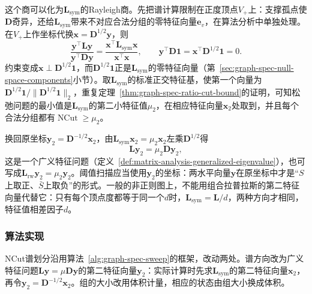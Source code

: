 这个商可以化为$\bm L_{\mathrm{sym}}$的Rayleigh商。先把谱计算限制在正度顶点$V_+$上：支撑孤点使$\bm D$奇异，还给$\bm L_{\mathrm{sym}}$带来不对应合法分组的零特征向量$\bm e_v$，在算法分析中单独处理。在$V_+$上作坐标代换$\bm x=\bm D^{1/2}\bm y$，则
\[
 \frac{\bm y^{\top}\bm L\bm y}{\bm y^{\top}\bm D\bm y}=\frac{\bm x^{\top}\bm L_{\mathrm{sym}}\bm x}{\bm x^{\top}\bm x},\qquad
 \bm y^{\top}\bm D\bm1=\bm x^{\top}\bm D^{1/2}\bm1=0 .
\]
约束变成$\bm x\perp\bm D^{1/2}\bm1$，而$\bm D^{1/2}\bm1$正是$\bm L_{\mathrm{sym}}$的零特征向量（第~\ref{sec:graph-spec-null-space-components}小节）。取$\bm L_{\mathrm{sym}}$的标准正交特征基，使第一个向量为$\bm D^{1/2}\bm1/\lVert\bm D^{1/2}\bm1\rVert_2$，重复定理~\ref{thm:graph-spec-ratio-cut-bound}的证明，可知松弛问题的最小值是$\bm L_{\mathrm{sym}}$的第二小特征值$\mu_2$，在相应特征向量$\bm x_2$处取到，并且每个合法分组都有$\operatorname{NCut}\geq\mu_2$。

换回原坐标$\bm y_2=\bm D^{-1/2}\bm x_2$，由$\bm L_{\mathrm{sym}}\bm x_2=\mu_2\bm x_2$左乘$\bm D^{1/2}$得
\[
 \bm L\bm y_2=\mu_2\bm D\bm y_2 ,
\]
这是一个广义特征问题（定义~\ref{def:matrix-analysis-generalized-eigenvalue}），也可写成$\bm L_{\mathrm{rw}}\bm y_2=\mu_2\bm y_2$。阈值扫描应当使用$\bm y_2$的坐标：两水平向量$\bm y$在原坐标中才是“$S$上取正、$\bar S$上取负”的形式。一般的非正则图上，不能用组合拉普拉斯的第二特征向量代替它：只有每个顶点度都等于同一个$d$时，$\bm L_{\mathrm{sym}}=\bm L/d$，两种方向才相同，特征值相差因子$d$。

\subsubsection{算法实现}

NCut谱划分沿用算法~\ref{alg:graph-spec-sweep}的框架，改动两处。谱方向改为广义特征问题$\bm L\bm y=\mu\bm D\bm y$的第二特征向量$\bm y_2$：实际计算时先求$\bm L_{\mathrm{sym}}$的第二特征向量$\bm x_2$，再令$\bm y_2=\bm D^{-1/2}\bm x_2$。组的大小改用体积计量，相应的状态由组大小换成体积。

